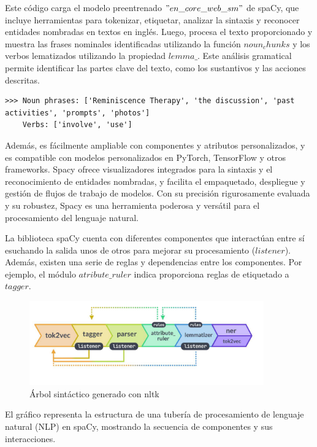 Este código carga el modelo preentrenado $"en\_core\_web\_sm"$ de spaCy, que incluye herramientas para tokenizar, etiquetar, analizar la sintaxis y reconocer entidades nombradas en textos en inglés. Luego, procesa el texto proporcionado y muestra las frases nominales identificadas utilizando la función $noun_chunks$ y los verbos lematizados utilizando la propiedad $lemma\_$. Este análisis gramatical permite identificar las partes clave del texto, como los sustantivos y las acciones descritas.

\begin{lstlisting}[style=SpyderStyle, caption={Resultado de tokenización usando spaCy}, captionpos=b, label={lst:python},breaklines = true]
	>>> Noun phrases: ['Reminiscence Therapy', 'the discussion', 'past activities', 'prompts', 'photos']
	Verbs: ['involve', 'use']
\end{lstlisting}

Además, es fácilmente ampliable con componentes y atributos personalizados, y es compatible con modelos personalizados en PyTorch, TensorFlow y otros frameworks. Spacy ofrece visualizadores integrados para la sintaxis y el reconocimiento de entidades nombradas, y facilita el empaquetado, despliegue y gestión de flujos de trabajo de modelos. Con su precisión rigurosamente evaluada y su robustez, Spacy es una herramienta poderosa y versátil para el procesamiento del lenguaje natural.

La biblioteca spaCy cuenta con diferentes componentes que interactúan entre sí esuchando la salida unos de otros para mejorar su procesamiento ($listener$). Además, existen una serie de reglas y dependencias entre los componentes. Por ejemplo, el módulo $atribute\_ruler$ indica proporciona reglas de etiquetado a $tagger$.

\begin{figure}[h]
	\centering
	\includegraphics[width=0.9\textwidth]{Imagenes/spaCy}
	\caption{Árbol sintáctico generado con nltk}
	\label{fig:1}
\end{figure}

El gráfico representa la estructura de una tubería de procesamiento de lenguaje natural (NLP) en spaCy, mostrando la secuencia de componentes y sus interacciones.


